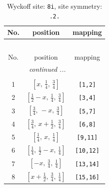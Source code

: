 \documentclass[fleqn,8pt]{jsarticle}
\begin{document}
\renewcommand{\arraystretch}{1.2}
\begin{longtable}{ccc}
\caption{Wyckoff site: {\tt 8i}, site symmetry: {\tt .2.}}
 \\
 \hline \hline
No. & position & mapping \\ \hline \endfirsthead

\multicolumn{2}{l}{\tablename\ \thetable{}} \\
 \hline \hline
No. & position & mapping \\ \hline \endhead

 \hline \hline
\multicolumn{2}{r}{\footnotesize\it continued ...} \\ \endfoot

 \hline \hline
\multicolumn{2}{r}{} \\ \endlastfoot

1 & $\left[ x,\, \frac{1}{4},\, \frac{3}{4} \right]$ & {\tt [1,2]} \\ \hline
2 & $\left[ \frac{1}{2} - x,\, \frac{1}{4},\, \frac{3}{4} \right]$ & {\tt [3,4]} \\ \hline
3 & $\left[ \frac{3}{4},\, - x,\, \frac{3}{4} \right]$ & {\tt [5,7]} \\ \hline
4 & $\left[ \frac{3}{4},\, x + \frac{1}{2},\, \frac{3}{4} \right]$ & {\tt [6,8]} \\ \hline
5 & $\left[ \frac{1}{4},\, x,\, \frac{1}{4} \right]$ & {\tt [9,11]} \\ \hline
6 & $\left[ \frac{1}{4},\, \frac{1}{2} - x,\, \frac{1}{4} \right]$ & {\tt [10,12]} \\ \hline
7 & $\left[ - x,\, \frac{3}{4},\, \frac{1}{4} \right]$ & {\tt [13,14]} \\ \hline
8 & $\left[ x + \frac{1}{2},\, \frac{3}{4},\, \frac{1}{4} \right]$ & {\tt [15,16]} \\
\end{longtable}
\renewcommand{\arraystretch}{1.2}
\end{document}
